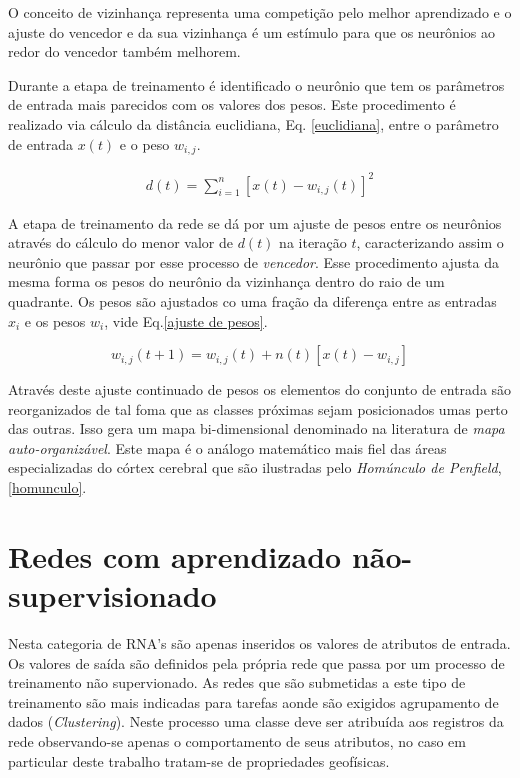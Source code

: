 O conceito de vizinhança representa uma competição pelo melhor aprendizado e o ajuste do vencedor e da sua vizinhança é um estímulo para que os neurônios ao redor do vencedor também melhorem.

Durante a etapa de treinamento é identificado o neurônio que tem os parâmetros de entrada mais parecidos com os valores dos pesos. Este procedimento é realizado via cálculo da distância euclidiana, Eq. \ref{euclidiana}, entre o parâmetro de entrada $x(t)$ e o peso $w_{i,j}$.

\begin{eqnarray}
d(t)= \sum^{n}_{i=1}[x(t)-w_{i,j}(t)]^{2}
\label{euclidiana}
\end{eqnarray}

A etapa de treinamento da rede se dá por um ajuste de pesos entre os neurônios através do cálculo do menor valor de $d(t)$ na iteração $t$, caracterizando assim o neurônio que passar por esse processo de \textit{vencedor}. Esse procedimento ajusta da mesma forma os pesos do neurônio da vizinhança dentro do raio de um quadrante. Os pesos são ajustados co uma fração da diferença entre as entradas $x_{i}$ e os pesos $w_{i}$, vide Eq.\ref{ajuste de pesos}.

\begin{equation}
w_{i,j}(t+1)=w_{i,j}(t)+n(t)[x(t)-w_{i,j}]
\label{ajuste de pesos}
\end{equation}

Através deste ajuste continuado de pesos os elementos do conjunto de entrada são reorganizados de tal foma que as classes próximas sejam posicionados umas perto das outras. Isso gera um mapa bi-dimensional denominado na literatura de \textit{mapa auto-organizável}. Este mapa é o análogo matemático mais fiel das áreas especializadas do córtex cerebral que são ilustradas pelo \textit{Homúnculo de Penfield}, \ref{homunculo}.

\section{Redes com aprendizado não-supervisionado}

Nesta categoria de RNA's são apenas inseridos os valores de atributos de entrada. Os valores de saída são definidos pela própria rede que passa por um processo de treinamento não supervionado. As redes que são submetidas a este tipo de treinamento são mais indicadas para tarefas aonde são exigidos agrupamento de dados (\textit{Clustering}). Neste processo uma classe deve ser atribuída aos registros da rede observando-se apenas o comportamento de seus atributos, no caso em particular deste trabalho tratam-se de propriedades geofísicas.

